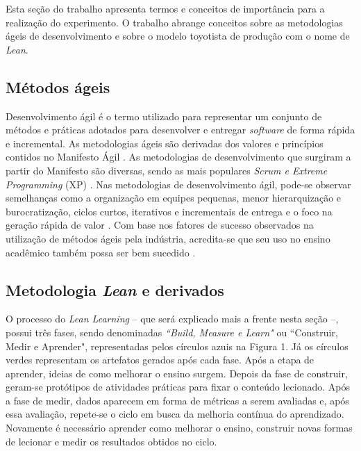 Esta seção do trabalho apresenta termos e conceitos de importância para a realização do experimento. O trabalho abrange conceitos sobre as metodologias ágeis de desenvolvimento e sobre o modelo toyotista de produção com o nome de \textit{Lean}.

\subsection{Métodos ágeis}

Desenvolvimento ágil é o termo utilizado para representar um conjunto de métodos e práticas adotados para desenvolver e entregar \textit{software} de forma rápida e incremental. As metodologias ágeis são derivadas dos valores e princípios contidos no Manifesto Ágil \cite{Manifesto}. As metodologias de desenvolvimento que surgiram a partir do Manifesto são diversas, sendo as mais populares \textit{Scrum e Extreme Programming} (XP) \cite{poth2019lean}. Nas metodologias de desenvolvimento ágil, pode-se observar semelhanças como a organização em equipes pequenas, menor hierarquização e burocratização, ciclos curtos, iterativos e incrementais de entrega e o foco na geração rápida de valor \cite{wei2019}. Com base nos fatores de sucesso observados na utilização de métodos ágeis pela indústria, acredita-se que seu uso no ensino acadêmico também possa ser bem sucedido \cite{fernandes2019identifying}.

\subsection{Metodologia \textit{Lean} e derivados}

O processo do \textit{Lean Learning} -- que será explicado mais a frente nesta seção --, possui três fases, sendo denominadas \textit{``Build, Measure e Learn"} ou ``Construir, Medir e Aprender", representadas pelos círculos azuis na Figura 1. Já os círculos verdes representam os artefatos gerados após cada fase. Após a etapa de aprender, ideias de como melhorar o ensino surgem. Depois da fase de construir, geram-se protótipos de atividades práticas para fixar o conteúdo lecionado. Após a fase de medir, dados aparecem em forma de métricas a serem avaliadas e, após essa avaliação, repete-se o ciclo em busca da melhoria contínua do aprendizado. Novamente é necessário aprender como melhorar o ensino, construir novas formas de lecionar e medir os resultados obtidos no ciclo.

